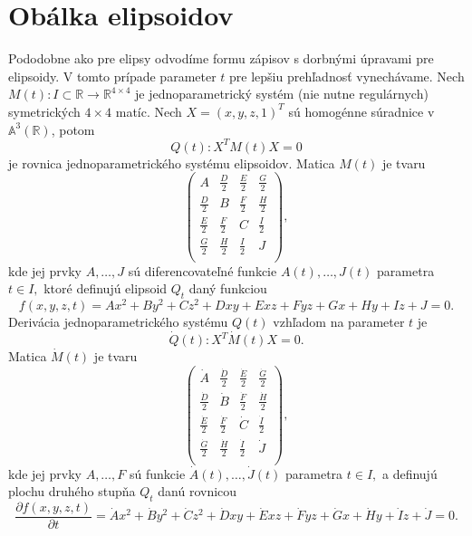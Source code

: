 \section{Obálka elipsoidov}
Pododobne ako pre elipsy odvodíme formu zápisov s dorbnými úpravami pre elipsoidy. V tomto prípade parameter $t$ pre lepšiu prehľadnosť vynechávame.
Nech $M(t) \colon I \subset \mathbb{R} \rightarrow \mathbb{R}^{4 \times 4}$ je jednoparametrický systém (nie nutne regulárnych) symetrických $4 \times 4$ matíc. Nech $ X = (x, y, z, 1)^T$ sú homogénne súradnice v $\mathbb{A}^3(\mathbb{R})$, potom
\begin{equation*}
Q(t) \colon X^T M(t) X = 0
\end{equation*}
je rovnica jednoparametrického systému elipsoidov. Matica $M(t)$ je tvaru
$$
\left(\begin{matrix} 
A & \frac{D}{2} & \frac{E}{2} & \frac{G}{2} \\
\frac{D}{2} & B & \frac{F}{2} & \frac{H}{2} \\
\frac{E}{2} & \frac{F}{2} & C & \frac{I}{2} \\
\frac{G}{2} & \frac{H}{2} & \frac{I}{2} & J \\
\end{matrix} \right),
$$
kde jej prvky $A, \dots, J$ sú diferencovateľné funkcie $A(t), \dots, J(t)$ parametra $t \in I,$ ktoré definujú elipsoid $Q_t$ daný funkciou 
$$
f(x, y, z, t) = Ax^2 + By^2 + Cz^2 + Dxy + Exz + Fyz + Gx + Hy + Iz + J = 0.
$$
Derivácia jednoparametrického systému $Q(t)$ vzhľadom na parameter $t$ je 
\begin{equation*}
\dot{Q}(t) \colon X^T \dot{M}(t) X = 0.
\end{equation*}
Matica $\dot{M}(t)$ je tvaru
$$
\left(\begin{matrix} 
\dot{A} & \frac{\dot{D}}{2} & \frac{\dot{E}}{2} & \frac{\dot{G}}{2} \\
\frac{\dot{D}}{2} & \dot{B} & \frac{\dot{F}}{2} & \frac{\dot{H}}{2} \\
\frac{\dot{E}}{2} & \frac{\dot{F}}{2} & \dot{C} & \frac{\dot{I}}{2} \\
\frac{\dot{G}}{2} & \frac{\dot{H}}{2} & \frac{\dot{I}}{2} & \dot{J} \\
\end{matrix} \right),
$$
kde jej prvky $A, \dots, F$ sú funkcie $\dot{A}(t), \dots, \dot{J}(t)$ parametra $t \in I,$ a definujú plochu druhého stupňa $Q_t$ danú rovnicou 
$$\dfrac{\partial f(x, y, z, t)}{\partial t} = \dot{A}x^2 + \dot{B}y^2 + \dot{C}z^2 + \dot{D}xy + \dot{E}xz + \dot{F}yz + \dot{G}x + \dot{H}y + \dot{I}z + \dot{J} = 0.$$
